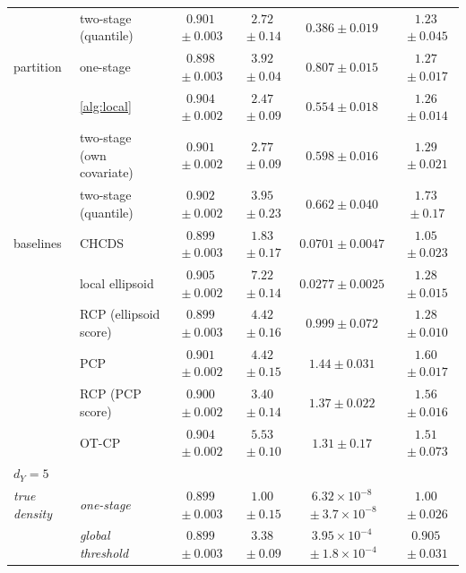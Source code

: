 \begin{table}[!t]
{\begin{tabular}{llcccc}
 & two-stage (quantile) & $0.901${\scriptsize${}\pm0.003$} & $2.72${\scriptsize${}\pm0.14$} & $0.386${\scriptsize${}\pm0.019$} & $1.23${\scriptsize${}\pm0.045$}\\
\addlinespace[2pt]
partition & one-stage & $0.898${\scriptsize${}\pm0.003$} & $3.92${\scriptsize${}\pm0.04$} & $0.807${\scriptsize${}\pm0.015$} & $1.27${\scriptsize${}\pm0.017$}\\
 & \cref{alg:local} & $0.904${\scriptsize${}\pm0.002$} & $2.47${\scriptsize${}\pm0.09$} & $0.554${\scriptsize${}\pm0.018$} & $1.26${\scriptsize${}\pm0.014$}\\
 & two-stage (own covariate) & $0.901${\scriptsize${}\pm0.002$} & $2.77${\scriptsize${}\pm0.09$} & $0.598${\scriptsize${}\pm0.016$} & $1.29${\scriptsize${}\pm0.021$}\\
 & two-stage (quantile) & $0.902${\scriptsize${}\pm0.002$} & $3.95${\scriptsize${}\pm0.23$} & $0.662${\scriptsize${}\pm0.040$} & $1.73${\scriptsize${}\pm0.17$}\\
\addlinespace[2pt]
baselines & CHCDS & $0.899${\scriptsize${}\pm0.003$} & $1.83${\scriptsize${}\pm0.17$} & $0.0701${\scriptsize${}\pm0.0047$} & $1.05${\scriptsize${}\pm0.023$}\\
 & local ellipsoid & $0.905${\scriptsize${}\pm0.002$} & $7.22${\scriptsize${}\pm0.14$} & $0.0277${\scriptsize${}\pm0.0025$} & $1.28${\scriptsize${}\pm0.015$}\\
 & RCP (ellipsoid score) & $0.899${\scriptsize${}\pm0.003$} & $4.42${\scriptsize${}\pm0.16$} & $0.999${\scriptsize${}\pm0.072$} & $1.28${\scriptsize${}\pm0.010$}\\
 & PCP & $0.901${\scriptsize${}\pm0.002$} & $4.42${\scriptsize${}\pm0.15$} & $1.44${\scriptsize${}\pm0.031$} & $1.60${\scriptsize${}\pm0.017$}\\
 & RCP (PCP score) & $0.900${\scriptsize${}\pm0.002$} & $3.40${\scriptsize${}\pm0.14$} & $1.37${\scriptsize${}\pm0.022$} & $1.56${\scriptsize${}\pm0.016$}\\
 & OT-CP & $0.904${\scriptsize${}\pm0.002$} & $5.53${\scriptsize${}\pm0.10$} & $1.31${\scriptsize${}\pm0.17$} & $1.51${\scriptsize${}\pm0.073$}\\
\midrule
\multicolumn{6}{l}{$d_Y=5$}\\
\addlinespace[2pt]
\textit{true density} & \textit{one-stage} & $0.899${\scriptsize${}\pm0.003$} & $1.00${\scriptsize${}\pm0.15$} & $6.32\times10^{-8}${\scriptsize${}\pm3.7\times10^{-8}$} & $1.00${\scriptsize${}\pm0.026$}\\
 & \textit{global threshold} & $0.899${\scriptsize${}\pm0.003$} & $3.38${\scriptsize${}\pm0.09$} & $3.95\times10^{-4}${\scriptsize${}\pm1.8\times10^{-4}$} & $0.905${\scriptsize${}\pm0.031$}\\

\end{tabular}}
\end{table}
